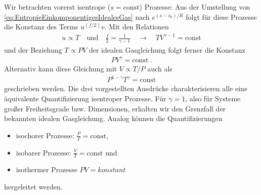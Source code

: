 Wir betrachten vorerst isentrope ($s=\mathrm{const}$) Prozesse:
Aus der Umstellung von \eqref{eq:EntropieEinkomponentigesIdealesGas} nach $e^{(s-s_0)/R}$ folgt für diese Prozesse die Konstanz des Terms $u^{(f/2)}v$.  Mit den Relationen 
\begin{align*}
    u \propto T \quad\text{und}\quad \frac{f}{2}=\frac{1}{\gamma -1}\quad\rightarrow\quad TV^{\gamma-1}=\mathrm{const}
\end{align*}
und der Beziehung $T\propto PV$ der idealen Gasgleichung folgt ferner die Konstanz 
\begin{align*}
    \boxed{PV^{\gamma}=\mathrm{const}}\:.
\end{align*}
Alternativ kann diese Gleichung mit $V\propto T/P$ auch als 
\begin{align*}
    P^{1-\gamma}T^\gamma=\mathrm{const}
\end{align*}
geschrieben werden.
Die drei vorgestellten Ausdrücke charakterisieren alle eine äquivalente Quantifizierung isentroper Prozesse.
Für $\gamma = 1$, also für Systeme großer Freiheitsgrade bzw. Dimensionen, erhalten wir den Grenzfall der bekannten idealen Gasgleichung. 
Analog können die Quantifizierungen 
\begin{itemize}
    \item isochorer Prozesse: $\frac{P}{T}=\mathrm{const}$,
    \item isobarer Prozesse: $\frac{V}{T}=\mathrm{const}$ und
    \item isothermer Prozesse $PV=konstant$
\end{itemize}
hergeleitet werden.  

